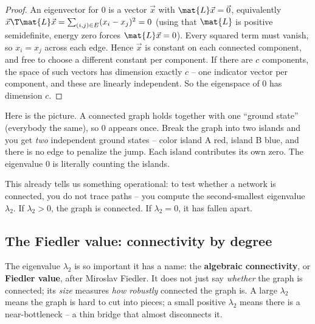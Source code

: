 \begin{proof}
An eigenvector for $0$ is a vector $\vec{x}$ with $\mat{L}\vec{x}=\vec{0}$, equivalently
$\vec{x}\T\mat{L}\vec{x} = \sum_{(i,j)\in E}(x_i-x_j)^2 = 0$ (using that $\mat{L}$ is
positive semidefinite, energy zero forces $\mat{L}\vec x = 0$). Every squared term must
vanish, so $x_i = x_j$ across each edge. Hence $\vec{x}$ is constant on each connected
component, and free to choose a different constant per component. If there are $c$
components, the space of such vectors has dimension exactly $c$ -- one indicator vector per
component, and these are linearly independent. So the eigenspace of $0$ has dimension $c$.
\end{proof}

\begin{intuitionbox}
Here is the picture. A connected graph holds together with one ``ground state'' (everybody
the same), so $0$ appears once. Break the graph into two islands and you get \emph{two}
independent ground states -- color island A red, island B blue, and there is no edge to
penalize the jump. Each island contributes its own zero. The eigenvalue $0$ is literally
counting the islands.
\end{intuitionbox}

This already tells us something operational: to test whether a network is connected, you do
not trace paths -- you compute the second-smallest eigenvalue $\lambda_2$. If
$\lambda_2 > 0$, the graph is connected. If $\lambda_2 = 0$, it has fallen apart.

\subsection{The Fiedler value: connectivity by degree}

The eigenvalue $\lambda_2$ is so important it has a name: the \textbf{algebraic
connectivity}, or \textbf{Fiedler value}, after Miroslav Fiedler. It does not just say
\emph{whether} the graph is connected; its \emph{size} measures \emph{how robustly}
connected the graph is. A large $\lambda_2$ means the graph is hard to cut into pieces; a
small positive $\lambda_2$ means there is a near-bottleneck -- a thin bridge that almost
disconnects it.

